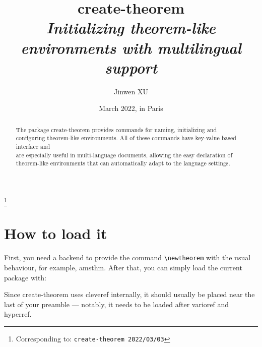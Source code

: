 \documentclass[classical]{einfart}
\newenvironment{tip}[1][Tip]{%
    \LocallyStopLineNumbers%
    \begin{tcolorbox}[breakable,
        enhanced,
        width = \textwidth,
        colback = paper, colbacktitle = paper,
        colframe = gray!50, boxrule=0.2mm,
        coltitle = black,
        fonttitle = \sffamily,
        attach boxed title to top left = {yshift=-\tcboxedtitleheight/2, xshift=.5cm},
        boxed title style = {boxrule=0pt, colframe=paper},
        before skip = 3mm,
        after skip = 3mm,
        top = 2.5mm,
        bottom = 1.5mm,
        title={\scshape\sffamily #1}]%
}{\end{tcolorbox}\ResumeLineNumbers}
\newcommand{\createtheorempackage}{\textsf{create-theorem}}
\begin{document}
\title{\createtheorempackage{}\\\smallskip\itshape Initializing theorem-like environments with multilingual support}
\author{Jinwen XU}
\thanks{Corresponding to: \texttt{\createtheorempackage{} 2022/03/03}}
\date{March 2022, in Paris}

\maketitle

\begin{abstract}
    \raggedleft
    The package \createtheorempackage{} provides commands for naming, initializing and configuring theorem-like environments. All of these commands have key-value based interface and \\are especially useful in multi-language documents, allowing the easy declaration of \\theorem-like environments that can automatically adapt to the language settings.
\end{abstract}

\vspace{-.5\baselineskip}



\section{How to load it}

First, you need a backend to provide the command \lstinline|\newtheorem| with the usual behaviour, for example, \textsf{amsthm}. After that, you can simply load the current package with:

\begin{code}
\usepackage{create-theorem}
\end{code}

\begin{tip}
    Since \createtheorempackage{} uses \textsf{cleveref} internally, it should usually be placed near the last of your preamble --- notably, it needs to be loaded after \textsf{varioref} and \textsf{hyperref}.
\end{tip}
\end{document}
